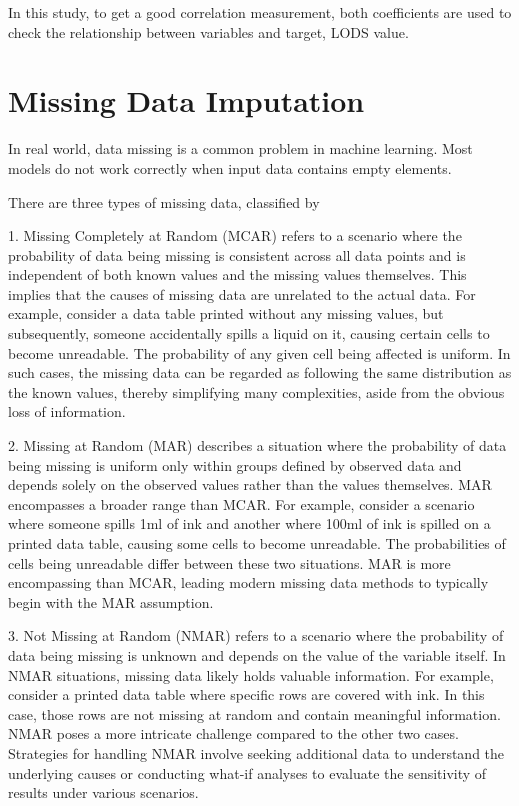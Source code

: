 \documentclass[12pt,a4paper,english
]{tunithesis}
\begin{document}
In this study, to get a good correlation measurement, both coefficients are used to check the relationship between variables and target, LODS value.

\section{Missing Data Imputation}
In real world, data missing is a common problem in machine learning. Most models do not work correctly when input data contains empty elements.

There are three types of missing data, classified by \textcite{rubin1976}

1. Missing Completely at Random (MCAR) refers to a scenario where the probability of data being missing is consistent across all data points and is independent of both known values and the missing values themselves. This implies that the causes of missing data are unrelated to the actual data. For example, consider a data table printed without any missing values, but subsequently, someone accidentally spills a liquid on it, causing certain cells to become unreadable. The probability of any given cell being affected is uniform. In such cases, the missing data can be regarded as following the same distribution as the known values, thereby simplifying many complexities, aside from the obvious loss of information.

2. Missing at Random (MAR) describes a situation where the probability of data being missing is uniform only within groups defined by observed data and depends solely on the observed values rather than the values themselves. MAR encompasses a broader range than MCAR. For example, consider a scenario where someone spills 1ml of ink and another where 100ml of ink is spilled on a printed data table, causing some cells to become unreadable. The probabilities of cells being unreadable differ between these two situations. MAR is more encompassing than MCAR, leading modern missing data methods to typically begin with the MAR assumption.

3. Not Missing at Random (NMAR) refers to a scenario where the probability of data being missing is unknown and depends on the value of the variable itself. In NMAR situations, missing data likely holds valuable information. For example, consider a printed data table where specific rows are covered with ink. In this case, those rows are not missing at random and contain meaningful information. NMAR poses a more intricate challenge compared to the other two cases. Strategies for handling NMAR involve seeking additional data to understand the underlying causes or conducting what-if analyses to evaluate the sensitivity of results under various scenarios.\parencite{vanbuuren2018}
\end{document}
